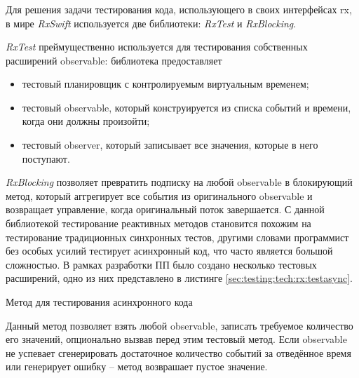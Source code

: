 \subsubsection{}
\label{sec:testing:tech:rx}

Для решения задачи тестирования кода, использующего в своих интерфейсах \gls{rx}, в мире \textit{RxSwift} используется две библиотеки: \textit{RxTest} и \textit{RxBlocking}.

\textit{RxTest} преймущественно используется для тестирования собственных расширений \gls{observable}: библиотека предоставляет

\begin{itemize}
	\item тестовый планировщик с контролируемым виртуальным временем;
	\item тестовый \gls{observable}, который конструируется из списка событий и времени, когда они должны произойти;
	\item тестовый \gls{observer}, который записывает все значения, которые в него поступают.
\end{itemize}

\textit{RxBlocking} позволяет превратить подписку на любой \gls{observable} в блокирующий метод, который аггрегирует все события из оригинального \gls{observable} и возвращает управление, когда оригинальный поток завершается. С данной библиотекой тестирование реактивных методов становится похожим на тестирование традиционных синхронных тестов, другими словами программист без особых усилий тестирует асинхронный код, что часто является большой сложностью. В рамках разработки ПП было создано несколько тестовых расширений, одно из них представлено в листинге \ref{sec:testing:tech:rx:testasync}.

\begin{code}[h!]
  
   \caption{Метод для тестирования асинхронного кода}
   \label{sec:testing:tech:rx:testasync}
\end{code}

Данный метод позволяет взять любой \gls{observable}, записать требуемое количество его значений, опционально вызвав перед этим тестовый метод. Если \gls{observable} не успевает сгенерировать достаточное количество событий за отведённое время или генерирует ошибку -- метод возврашает пустое значение.